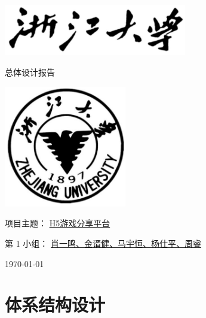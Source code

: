 \documentclass[12pt]{ctexart} %
\begin{document}
\begin{titlepage}
  \centering %
  \includegraphics[width=0.6\textwidth]{zjutitle.jpg} %
  
  \vspace{2cm} %
  
  {\fontsize{36}{48}\selectfont{} 总体设计报告} %
  
  \vspace{2cm} %
  
  \includegraphics[width=0.4\textwidth]{zjulogo.jpg} %
  
  \vspace{2cm}
  
  {\Huge{} 项目主题： \underline{H5游戏分享平台}} %
  
  \vspace{1cm}

  {\Large{} 第 1 小组： \underline{肖一鸣、金谞健、马宇恒、杨仕平、周睿}} %
  
  \vspace{1cm} %
  
  {\Large{} \today} %

\end{titlepage}

\newpage
\tableofcontents %
\newpage

\section{体系结构设计}
\end{document}
